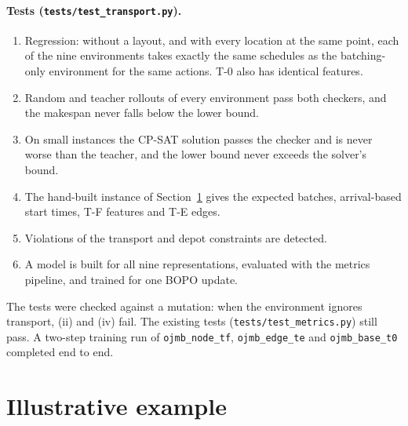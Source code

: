 \documentclass[11pt,a4paper]{article}
\begin{document}
\paragraph{Tests (\texttt{tests/test\_transport.py}).}
\begin{enumerate}[label=(\roman*)]
  \item Regression: without a layout, and with every location at the same point,
    each of the nine environments takes exactly the same schedules as the
    batching-only environment for the same actions. T-0 also has identical
    features.
  \item Random and teacher rollouts of every environment pass both checkers, and
    the makespan never falls below the lower bound.
  \item On small instances the CP-SAT solution passes the checker and is never
    worse than the teacher, and the lower bound never exceeds the solver's bound.
  \item The hand-built instance of Section~\ref{sec:example} gives the expected
    batches, arrival-based start times, T-F features and T-E edges.
  \item Violations of the transport and depot constraints are detected.
  \item A model is built for all nine representations, evaluated with the metrics
    pipeline, and trained for one BOPO update.
\end{enumerate}
The tests were checked against a mutation: when the environment ignores
transport, (ii) and (iv) fail. The existing tests (\texttt{tests/test\_metrics.py})
still pass. A two-step training run of \texttt{ojmb\_node\_tf},
\texttt{ojmb\_edge\_te} and \texttt{ojmb\_base\_t0} completed end to end.

\section{Illustrative example}
\label{sec:example}
\end{document}
